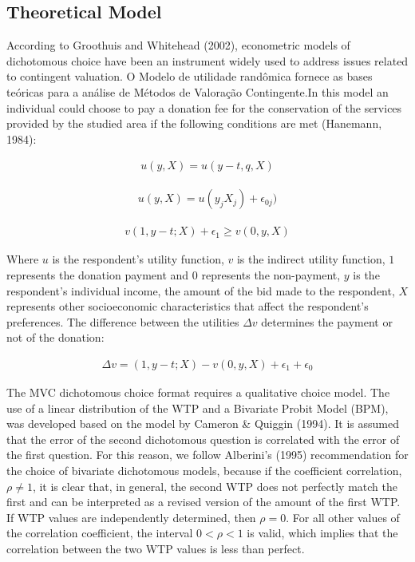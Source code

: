 \documentclass[smallextended]{svjour3}       %
\begin{document}
\hypertarget{theoretical-model}{%
\subsection{Theoretical Model}\label{theoretical-model}}

According to Groothuis and Whitehead (2002), econometric models of
dichotomous choice have been an instrument widely used to address issues
related to contingent valuation. O Modelo de utilidade randômica fornece
as bases teóricas para a análise de Métodos de Valoração Contingente.In
this model an individual could choose to pay a donation fee for the
conservation of the services provided by the studied area if the
following conditions are met (Hanemann, 1984):

\begin{align}
u(y, X) = u(y-t, q, X)
\end{align}

\begin{align}
u(y, X) = u(y_{j}X_{j}) + \epsilon_{0j})
\end{align}

\begin{align}
v(1, y-t; X) + \epsilon_{1} \ge v(0, y, X)
\end{align}

Where \(u\) is the respondent's utility function, \(v\) is the indirect
utility function, \(1\) represents the donation payment and \(0\)
represents the non-payment, \(y\) is the respondent's individual income,
the amount of the bid made to the respondent, \(X\) represents other
socioeconomic characteristics that affect the respondent's preferences.
The difference between the utilities \(\Delta v\) determines the payment
or not of the donation:

\begin{align}
\Delta v= (1, y-t;X) -v(0, y, X) + \epsilon_{1} + \epsilon_{0}  
\end{align}

The MVC dichotomous choice format requires a qualitative choice model.
The use of a linear distribution of the WTP and a Bivariate Probit Model
(BPM), was developed based on the model by Cameron \& Quiggin (1994). It
is assumed that the error of the second dichotomous question is
correlated with the error of the first question. For this reason, we
follow Alberini's (1995) recommendation for the choice of bivariate
dichotomous models, because if the coefficient correlation,
\(\rho \ne 1\), it is clear that, in general, the second WTP does not
perfectly match the first and can be interpreted as a revised version of
the amount of the first WTP. If WTP values are independently determined,
then \(\rho = 0\). For all other values of the correlation coefficient,
the interval \(0 < \rho < 1\) is valid, which implies that the
correlation between the two WTP values is less than perfect.
\end{document}
